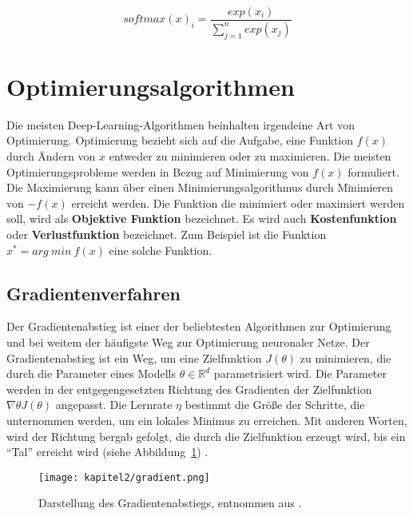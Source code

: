 \begin{equation} \label{FormelSoft}
    softmax( x)_{i} =\frac{exp( x_{i})}{\sum ^{n}_{j=1} exp( x_{j})}
\end{equation}

\section{Optimierungsalgorithmen}
Die meisten Deep-Learning-Algorithmen beinhalten irgendeine Art von Optimierung. Optimierung bezieht sich auf die Aufgabe, eine Funktion $f(x)$ durch Ändern von $x$ entweder zu minimieren oder zu maximieren. Die meisten Optimierungsprobleme werden in Bezug auf Minimierung von $f(x)$ formuliert. Die Maximierung kann über einen Minimierungsalgorithmus durch Minimieren von $-$$f(x)$ erreicht werden. Die Funktion die minimiert oder maximiert werden soll, wird als \textbf{Objektive Funktion} bezeichnet. Es wird auch \textbf{Kostenfunktion} oder \textbf{Verlustfunktion} bezeichnet. Zum Beispiel ist die Funktion $x^{*} = arg\ min\ f( x)$ eine solche Funktion.

        \subsection{Gradientenverfahren}
        Der Gradientenabstieg ist einer der beliebtesten Algorithmen zur Optimierung und bei weitem der häufigste Weg zur Optimierung neuronaler Netze. Der Gradientenabstieg ist ein Weg, um eine Zielfunktion $J(\theta)$ zu minimieren, die durch die Parameter eines Modells $\theta \in \mathbb{R}^{d}$ parametrisiert wird. Die Parameter werden in der entgegengesetzten Richtung des Gradienten der Zielfunktion $\nabla \theta J (\theta)$ angepasst. Die Lernrate $\eta$ bestimmt die Größe der Schritte, die unternommen werden, um ein lokales Minimus zu erreichen. Mit anderen Worten, wird der Richtung bergab gefolgt, die durch die Zielfunktion erzeugt wird, bis ein \enquote{Tal} erreicht wird (siehe Abbildung~\ref{Kap2:Grad}) \cite*{Ruder2016}.



        \begin{figure}[H]
            \centering
            \texttt{[image: kapitel2/gradient.png]}
            \caption[Der Gradientenabstieg]{Darstellung des Gradientenabstiegs, entnommen aus \cite*{hackernoon}.}
            \label{Kap2:Grad}
        \end{figure}



